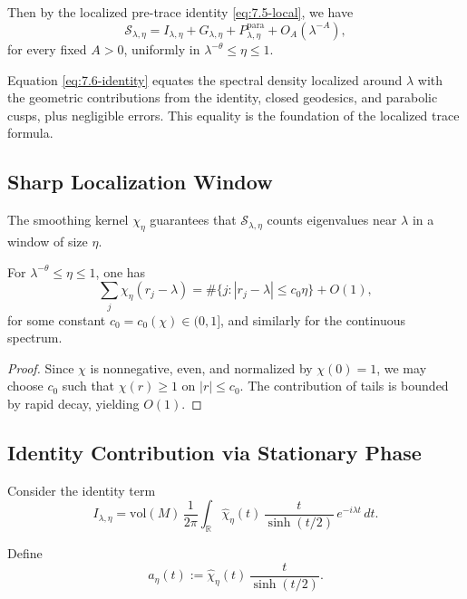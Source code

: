 Then by the localized pre-trace identity \eqref{eq:7.5-local}, we have
\begin{equation}\label{eq:7.6-identity}
  \mathcal{S}_{\lambda,\eta}
  = I_{\lambda,\eta} + G_{\lambda,\eta} + P_{\lambda,\eta}^{\mathrm{para}}
  + O_A(\lambda^{-A}),
\end{equation}
for every fixed $A>0$, uniformly in $\lambda^{-\theta}\le \eta\le 1$.

\begin{remark}[Interpretation]
Equation \eqref{eq:7.6-identity} equates the spectral density localized around
$\lambda$ with the geometric contributions from the identity, closed geodesics,
and parabolic cusps, plus negligible errors.  
This equality is the foundation of the localized trace formula.
\end{remark}

\subsection{Sharp Localization Window}

The smoothing kernel $\chi_\eta$ guarantees that $\mathcal{S}_{\lambda,\eta}$ counts eigenvalues near $\lambda$ in a window of size $\eta$.

\begin{proposition}\label{prop:7.6-window}
For $\lambda^{-\theta}\le \eta\le 1$, one has
\[
  \sum_j \chi_\eta(r_j-\lambda)
  = \#\{j : |r_j-\lambda|\le c_0 \eta\} + O(1),
\]
for some constant $c_0=c_0(\chi)\in(0,1]$, and similarly for the continuous spectrum.
\end{proposition}

\begin{proof}
Since $\chi$ is nonnegative, even, and normalized by $\chi(0)=1$, we may
choose $c_0$ such that $\chi(r)\ge 1$ on $|r|\le c_0$.  
The contribution of tails is bounded by rapid decay, yielding $O(1)$.
\end{proof}

\subsection{Identity Contribution via Stationary Phase}

Consider the identity term
\[
  I_{\lambda,\eta}
  = \mathrm{vol}(M)\,\frac{1}{2\pi}
    \int_{\mathbb{R}} \widehat{\chi}_\eta(t)\, \frac{t}{\sinh(t/2)}\,
    e^{-i\lambda t}\, dt.
\]

Define
\[
  a_\eta(t) := \widehat{\chi}_\eta(t)\,\frac{t}{\sinh(t/2)}.
\]

